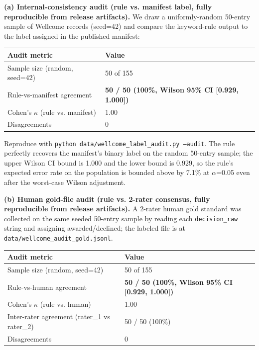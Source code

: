 \documentclass[11pt]{article}
\begin{document}
\textbf{(a) Internal-consistency audit (rule vs. manifest label, fully reproducible from release artifacts).} We draw a uniformly-random 50-entry sample of Wellcome records (seed=42) and compare the keyword-rule output to the label assigned in the published manifest:

\begin{table}[H]
\centering
\small
\begin{tabular}{ll}
\toprule
Audit metric & Value \\
\midrule
Sample size (random, seed=42) & 50 of 155 \\
Rule-vs-manifest agreement & \textbf{50 / 50 (100\%, Wilson 95\% CI [0.929, 1.000])} \\
Cohen's $\kappa$ (rule vs. manifest) & 1.00 \\
Disagreements & 0 \\
\bottomrule
\end{tabular}
\end{table}

Reproduce with \texttt{python data/wellcome\_label\_audit.py --audit}. The rule perfectly recovers the manifest's binary label on the random 50-entry sample; the upper Wilson CI bound is 1.000 and the lower bound is 0.929, so the rule's expected error rate on the population is bounded above by 7.1\% at $\alpha$=0.05 even after the worst-case Wilson adjustment.

\textbf{(b) Human gold-file audit (rule vs. 2-rater consensus, fully reproducible from release artifacts).} A 2-rater human gold standard was collected on the same seeded 50-entry sample by reading each \texttt{decision\_raw} string and assigning awarded/declined; the labeled file is at \texttt{data/wellcome\_audit\_gold.jsonl}.

\begin{table}[H]
\centering
\small
\begin{tabular}{ll}
\toprule
Audit metric & Value \\
\midrule
Sample size (random, seed=42) & 50 of 155 \\
Rule-vs-human agreement & \textbf{50 / 50 (100\%, Wilson 95\% CI [0.929, 1.000])} \\
Cohen's $\kappa$ (rule vs. human) & 1.00 \\
Inter-rater agreement (rater\_1 vs rater\_2) & 50 / 50 (100\%) \\
Disagreements & 0 \\
\bottomrule
\end{tabular}
\end{table}
\end{document}

